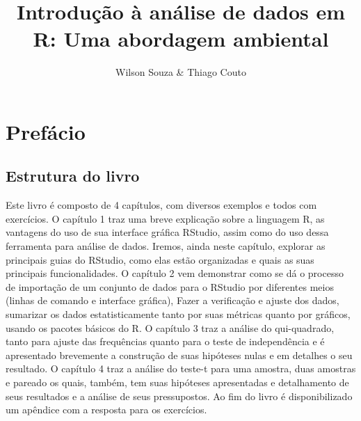 \documentclass[14pt,titlepage, oneside, openany, a4paper]{book}
\title{Introdução à análise de dados em R: Uma abordagem ambiental}
\author{Wilson Souza \& Thiago Couto}
\date{}
\let\oldmaketitle\maketitle
\begin{document}
\maketitle


\begin{figure}
  
\end{figure}

\let\maketitle\oldmaketitle
\maketitle

\renewcommand*\contentsname{Índice}
{
\hypersetup{linkcolor=}
\setcounter{tocdepth}{1}
\tableofcontents
}
\listoftables
\listoffigures
\hypertarget{prefuxe1cio}{%
\chapter*{Prefácio}\label{prefuxe1cio}}

\hypertarget{estrutura-do-livro}{%
\section*{Estrutura do livro}\label{estrutura-do-livro}}

Este livro é composto de 4 capítulos, com diversos exemplos e todos com exercícios. O capítulo 1 traz uma breve explicação sobre a linguagem R, as vantagens do uso de sua interface gráfica RStudio, assim como do uso dessa ferramenta para análise de dados. Iremos, ainda neste capítulo, explorar as principais guias do RStudio, como elas estão organizadas e quais as suas principais funcionalidades. O capítulo 2 vem demonstrar como se dá o processo de importação de um conjunto de dados para o RStudio por diferentes meios (linhas de comando e interface gráfica), Fazer a verificação e ajuste dos dados, sumarizar os dados estatisticamente tanto por suas métricas quanto por gráficos, usando os pacotes básicos do R. O capítulo 3 traz a análise do qui-quadrado, tanto para ajuste das frequências quanto para o teste de independência e é apresentado brevemente a construção de suas hipóteses nulas e em detalhes o seu resultado. O capítulo 4 traz a análise do teste-t para uma amostra, duas amostras e pareado os quais, também, tem suas hipóteses apresentadas e detalhamento de seus resultados e a análise de seus pressupostos. Ao fim do livro é disponibilizado um apêndice com a resposta para os exercícios.
\end{document}
